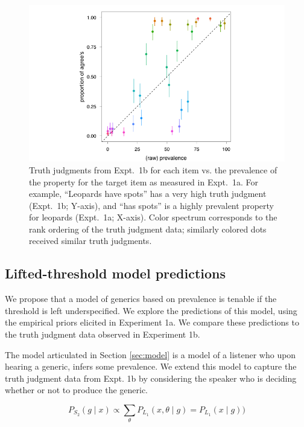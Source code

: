 \documentclass[10pt,letterpaper]{article}
\begin{document}
\begin{figure}
\centering
    \includegraphics[width=0.6\columnwidth]{tj_n50_tjVsPrevalence}
    \caption{Truth judgments from Expt.~1b for each item vs. the prevalence of the property for the target item as measured in Expt.~1a. For example, ``Leopards have spots'' has a very high truth judgment (Expt.~1b; Y-axis), and ``has spots'' is a highly prevalent property for leopards (Expt.~1a; X-axis). Color spectrum corresponds to the rank ordering of the truth judgment data; similarly colored dots received similar truth judgments.}
  \label{fig:scatterprev}
\end{figure}




\subsection{Lifted-threshold model predictions}

We propose that a model of generics based on prevalence is tenable if the threshold is left underspecified. We explore the predictions of this model, using the empirical priors elicited in Experiment 1a. We compare these predictions to the truth judgment data observed in Experiment 1b.

The model articulated in Section \ref{sec:model} is a model of a listener who upon hearing a generic, infers some prevalence. We extend this model to capture the truth judgment data from Expt. 1b by considering the speaker who is deciding whether or not to produce the generic. 


\begin{equation} 
P_{S_{2}}(g \mid x) \propto  \sum_{\theta} P_{L_{1}}(x , \theta \mid g) =  P_{L_{1}}(x \mid g))
\label{eq:S2}
\end{equation}
\end{document}
